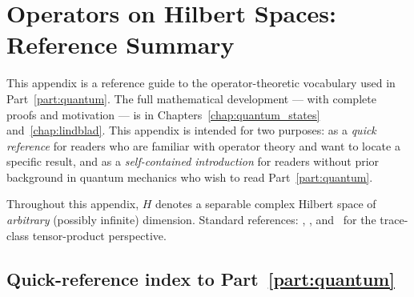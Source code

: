 %
%
%

\chapter{Operators on Hilbert Spaces: Reference Summary}
\label{app:quantum}

This appendix is a reference guide to the operator-theoretic vocabulary
used in Part~\ref{part:quantum}. The full mathematical development ---
with complete proofs and motivation --- is in
Chapters~\ref{chap:quantum_states} and~\ref{chap:lindblad}.
This appendix is intended for two purposes: as a \emph{quick reference}
for readers who are familiar with operator theory and want to locate a
specific result, and as a \emph{self-contained introduction} for
readers without prior background in quantum mechanics who wish to
read Part~\ref{part:quantum}.

Throughout this appendix, $H$ denotes a separable complex Hilbert space
of \emph{arbitrary} (possibly infinite) dimension.
Standard references: \cite{ReedSimon1972}, \cite{BratteliRobinson1987},
and~\cite{Ryan2002} for the trace-class tensor-product perspective.

\section{Quick-reference index to Part~\ref{part:quantum}}
\label{app:quantum:index}

